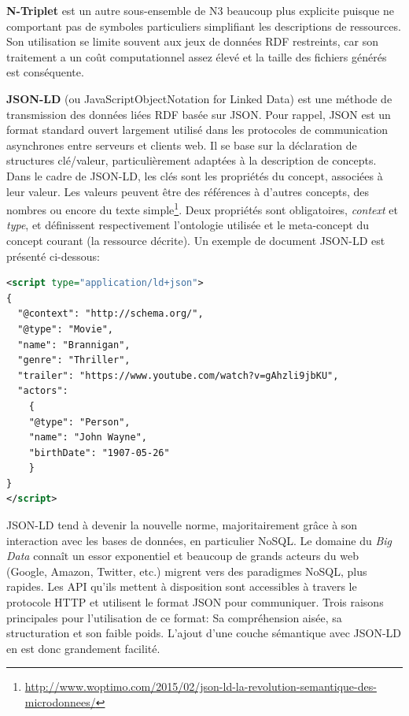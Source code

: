 \textbf{N-Triplet} est un autre sous-ensemble de N3 beaucoup plus explicite puisque ne comportant pas de symboles particuliers simplifiant les descriptions de ressources. Son utilisation se limite souvent aux jeux de données RDF restreints, car son traitement a un coût computationnel assez élevé et la taille des fichiers générés est conséquente.

\textbf{JSON-LD} (ou JavaScriptObjectNotation for Linked Data) est une méthode de transmission des données liées RDF basée sur JSON. Pour rappel, JSON est un format standard ouvert largement utilisé dans les protocoles de communication asynchrones entre serveurs et clients web. Il se base sur la déclaration de structures clé/valeur, particulièrement adaptées à la description de concepts. 
Dans le cadre de JSON-LD, les clés sont les propriétés du concept, associées à leur valeur. Les valeurs peuvent être des références à d’autres concepts, des nombres ou encore du texte simple\footnote{\url{http://www.woptimo.com/2015/02/json-ld-la-revolution-semantique-des-microdonnees/}}. Deux propriétés sont obligatoires, \textit{context} et \textit{type}, et définissent respectivement l'ontologie utilisée et le meta-concept du concept courant (la ressource décrite). Un exemple de document JSON-LD est présenté ci-dessous:

\begin{lstlisting}[language=XML]
<script type="application/ld+json">
{
  "@context": "http://schema.org/",
  "@type": "Movie",
  "name": "Brannigan",
  "genre": "Thriller",
  "trailer": "https://www.youtube.com/watch?v=gAhzli9jbKU",
  "actors":
    {
    "@type": "Person",
    "name": "John Wayne",
    "birthDate": "1907-05-26"
    }
}
</script>
\end{lstlisting}

JSON-LD tend à devenir la nouvelle norme, majoritairement grâce à son interaction avec les bases de données, en particulier NoSQL. Le domaine du \textit{Big Data} connaît un essor exponentiel et beaucoup de grands acteurs du web (Google, Amazon, Twitter, etc.) migrent vers des paradigmes NoSQL, plus rapides. Les API qu'ils mettent à disposition sont accessibles à travers le protocole HTTP et utilisent le format JSON pour communiquer. Trois raisons principales pour l'utilisation de ce format: Sa compréhension aisée, sa structuration et son faible poids. L'ajout d'une couche sémantique avec JSON-LD en est donc grandement facilité. 

